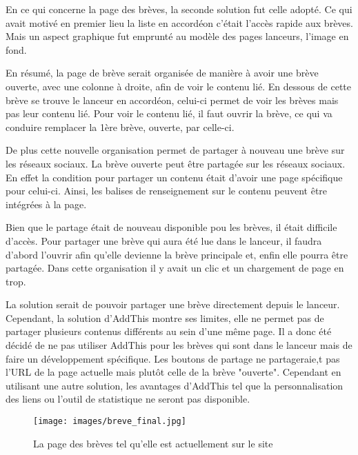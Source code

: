 \documentclass[12pt,a4paper]{article}
\begin{document}
En ce qui concerne la page des brèves, la seconde solution fut celle adopté. Ce qui avait motivé en premier lieu la liste en accordéon c'était l'accès rapide aux brèves. Mais un aspect graphique fut emprunté au modèle des pages lanceurs, l'image en fond.\par 
\medskip
En résumé, la page de brève serait organisée de manière à avoir une brève ouverte, avec une colonne à droite, afin de voir le contenu lié. En dessous de cette brève se trouve le lanceur en accordéon, celui-ci permet de voir les brèves mais pas leur contenu lié. Pour voir le contenu lié, il faut ouvrir la brève, ce qui va conduire remplacer la 1ère brève, ouverte, par celle-ci.\par
De plus cette nouvelle organisation permet de partager à nouveau une brève sur les réseaux sociaux. La brève ouverte peut être partagée sur les réseaux sociaux. En effet la condition pour partager un contenu était d'avoir une page spécifique pour celui-ci. Ainsi, les balises de renseignement sur le contenu peuvent être intégrées à la page.\par 
Bien que le partage était de nouveau disponible pou les brèves, il était difficile d'accès. Pour partager une brève qui aura été lue dans le lanceur, il faudra d'abord l'ouvrir afin qu'elle devienne la brève principale et, enfin elle pourra être partagée. Dans cette organisation il y avait un clic et un chargement de page en trop.\par 
La solution serait de pouvoir partager une brève directement depuis le lanceur. Cependant, la solution d'AddThis montre ses limites, elle ne permet pas de partager plusieurs contenus différents au sein d'une même page. Il a donc été décidé de ne pas utiliser AddThis pour les brèves qui sont dans le lanceur mais de faire un développement spécifique. Les boutons de partage ne partageraie,t pas l'URL de la page actuelle mais plutôt celle de la brève "ouverte". Cependant en utilisant une autre solution, les avantages d'AddThis tel que la personnalisation des liens ou l'outil de statistique ne seront pas disponible.\par

\begin{figure}[h!]
\centering\texttt{[image: images/breve\_final.jpg]} 
\caption{La page des brèves tel qu'elle est actuellement sur le site}
\end{figure}
\end{document}

